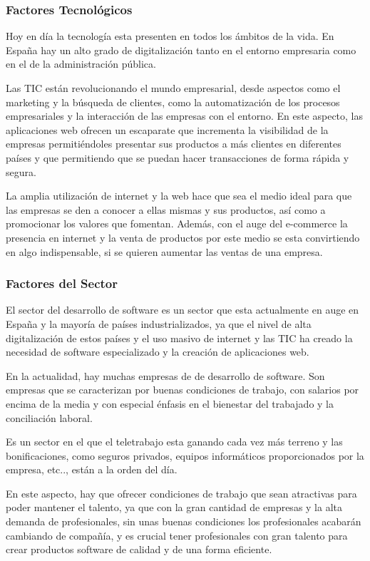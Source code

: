 \subsubsection{Factores Tecnológicos}
Hoy en día la tecnología esta presenten en todos los ámbitos de la vida. En España hay un alto grado de digitalización tanto en el entorno empresaria como en el de la administración pública.

Las TIC están revolucionando el mundo empresarial, desde aspectos como el marketing y la búsqueda de clientes, como la automatización de los procesos empresariales y la interacción de las empresas con el entorno. En este aspecto, las aplicaciones web ofrecen un escaparate que incrementa la visibilidad de la empresas permitiéndoles presentar sus productos a más clientes en diferentes países y que permitiendo que se puedan hacer transacciones de forma rápida y segura.

La amplia utilización de internet y la web hace que sea el medio ideal para que las empresas se den a conocer a ellas mismas y sus productos, así como a promocionar los valores que fomentan. Además, con el auge del e-commerce la presencia en internet y la venta de productos por este medio se esta convirtiendo en algo indispensable, si se quieren aumentar las ventas de una empresa.

\subsubsection{Factores del Sector}
El sector del desarrollo de software es un sector que esta actualmente en auge en España y la mayoría de países industrializados, ya que el nivel de alta digitalización de estos países y el uso masivo de internet y las TIC ha creado la necesidad de software especializado y la creación de aplicaciones web.

En la actualidad, hay muchas empresas de de desarrollo de software. Son empresas que se caracterizan por buenas condiciones de trabajo, con salarios por encima de la media y con especial énfasis en el bienestar del trabajado y la conciliación laboral.

Es un sector en el que el teletrabajo esta ganando cada vez más terreno y las bonificaciones, como seguros privados, equipos informáticos proporcionados por la empresa, etc.., están a la orden del día.

En este aspecto, hay que ofrecer condiciones de trabajo que sean atractivas para poder mantener el talento, ya que con la gran cantidad de empresas y la alta demanda de profesionales, sin unas buenas condiciones los profesionales acabarán cambiando de compañía, y es crucial tener profesionales con gran talento para crear productos software de calidad y de una forma eficiente.

